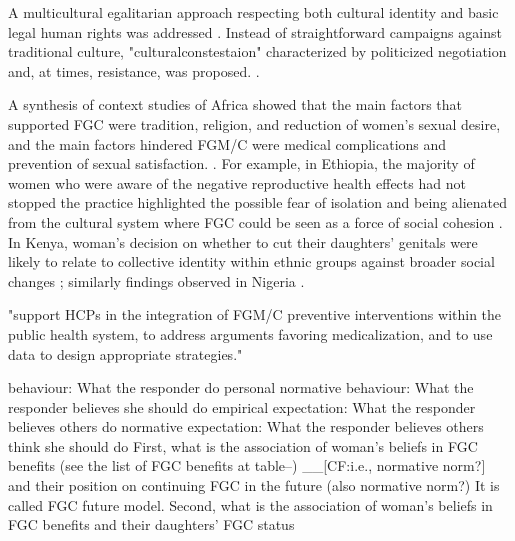 \documentclass[12pt,]{article}
\begin{document}

A multicultural egalitarian approach respecting both cultural identity and basic legal human rights was addressed \cite{BoylCarb10, Wade11}.  Instead of straightforward campaigns against traditional culture, "culturalconstestaion" characterized by politicized negotiation and, at times, resistance, was proposed. \cite{Koom14}.

A synthesis of context studies of Africa showed that the main factors that supported FGC were tradition, religion, and reduction of women's sexual desire, and the main factors hindered FGM/C were medical complications and prevention of sexual satisfaction. \cite{BergDeni12a}.  For example, in Ethiopia, the majority of women who were aware of the negative reproductive health effects had not stopped the practice highlighted the possible fear of isolation and being alienated from the cultural system where FGC could be seen as a force of social cohesion \cite{YirgKass12}.  In Kenya, woman's decision on whether to cut their daughters' genitals were likely to relate to collective identity within ethnic groups against broader social changes \cite{Achi14, Hayf05}; similarly findings observed in Nigeria \cite{FreyJohn07, KandMwek09}.

"support HCPs in the integration of FGM/C preventive interventions within the public health system, to address arguments favoring medicalization, and to use data to design appropriate strategies." \cite{KaplRiba16}


behaviour:  What the responder do 
personal normative behaviour:  What the responder believes she should do
empirical expectation:  What the responder believes others do
normative expectation: What the responder believes others think she should do
\cite{Bicc06}
First, what is the association of woman's beliefs in FGC benefits (see the list of FGC benefits at table--) \_\_{[}CF:i.e., normative norm?{]}
and their position on continuing FGC in the future (also normative norm?)  It is called FGC future model.  Second, what is the association of woman's beliefs in FGC benefits and their daughters' FGC status %
\end{document}
